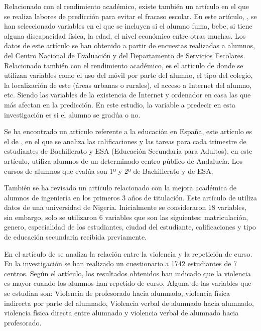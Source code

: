 
Relacionado con el rendimiento académico, existe también un artículo en el que se realiza labores de predicción para evitar el fracaso escolar. En este artículo, \cite{vera2012prediccion}, se han seleccionado variables en el que se incluyen si el alumno fuma, bebe, si tiene alguna discapacidad física, la edad, el nivel económico entre otras muchas. Los datos de este artículo se han obtenido a partir de encuestas realizadas a alumnos, del Centro Nacional de Evaluación y del Departamento de Servicios Escolares. Relacionado también con el rendimiento académico, es el artículo de  donde se utilizan variables como el uso del móvil por parte del alumno, el tipo del colegio, la localización de este (áreas urbanas o rurales), el acceso a Internet del alumno, etc. Siendo las variables de la existencia de Internet y ordenador en casa las que más afectan en la predicción. En este estudio, la variable a predecir en esta investigación es si el alumno se gradúa o no.

Se ha encontrado un artículo referente a la educación en España, este artículo es el de , en el que se analiza las calificaciones y las tareas para cada trimestre de estudiantes de Bachillerato y ESA (Educación Secundaria para Adultos). \citeauthor{jose2016explotacion} en este artículo, utiliza alumnos de un determinado centro público de Andalucía. Los cursos de alumnos que evalúa son 1º y 2º de Bachillerato y de ESA. 

También se ha revisado un artículo relacionado con la mejora académica de alumnos de ingeniería en los primeros 3 años de titulación. Este artículo de  utiliza datos de una universidad de Nigeria. 
Inicialmente se consideraron 18 variables, sin embargo, solo se utilizaron 6 variables que son las siguientes: matriculación, genero, especialidad de los estudiantes, ciudad del estudiante, calificaciones y tipo de educación secundaria recibida previamente.

En el artículo de  se analiza la relación entre la violencia y la repetición de curso. En la investigación se han realizado un cuestionario a 1742 estudiantes de 7 centros. Según el artículo, los resultados obtenidos han indicado que la violencia es mayor cuando los alumnos han repetido de curso. Alguna de las variables que se estudian son: Violencia de profesorado hacia alumnado, violencia física indirecta por parte del alumnado, Violencia verbal de alumnado hacia alumnado, violencia física directa entre alumnado y violencia verbal de alumnado hacia profesorado.


